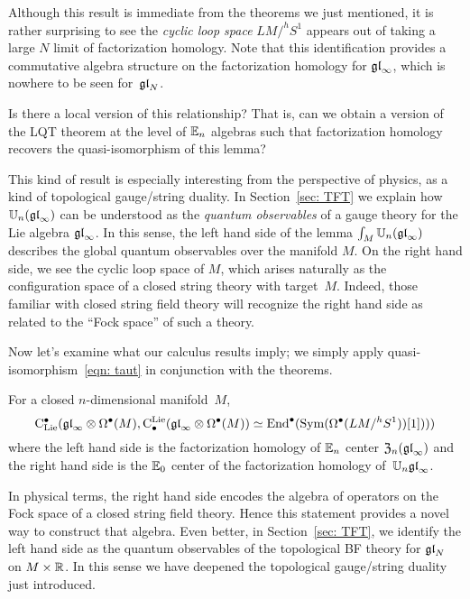 \documentclass[11pt]{amsart}
\numberwithin{equation}{section}
\begin{document}
Although this result is immediate from the theorems we just mentioned,
it is rather surprising to see the {\em cyclic loop space} $LM/^h S^1$ appears out of taking a large $N$ limit of factorization homology.
Note that this identification provides a commutative algebra structure on the factorization homology for ${\mathfrak{gl}}_\infty$, 
which is nowhere to be seen for~${\mathfrak{gl}}_N$.

\begin{qtn}
Is there a local version of this relationship? That is, can we obtain a version of the LQT theorem at the level of $\mathbb E_n$ algebras such that factorization homology recovers the quasi-isomorphism of this lemma?
\end{qtn}

This kind of result is especially interesting from the perspective of physics, 
as a kind of topological gauge/string duality.
In Section~\ref{sec: TFT} we explain how $\mathbb U_n({\mathfrak{gl}}_\infty)$ can be understood as the {\em quantum observables} of a gauge theory for the Lie algebra ${\mathfrak{gl}}_\infty$.
In this sense, the left hand side of the lemma $\int_M \mathbb U_n(\frak{gl}_\infty)$ describes the global quantum observables over the manifold $M$.
On the right hand side, we see the cyclic loop space of $M$,
which arises naturally as the configuration space of a closed string theory with target~$M$.
Indeed, those familiar with closed string field theory will recognize the right hand side as related to the ``Fock space'' of such a theory.

Now let's examine what our calculus results imply;
we simply apply quasi-isomorphism~\eqref{eqn: taut} in conjunction with the theorems.

\begin{lmm}
For a closed $n$-dimensional manifold~$M$, 
\[
{\rm C}_{\rm Lie}^\bullet({\mathfrak{gl}}_\infty \otimes \Omega^\bullet(M), {\rm C}^{\rm Lie}_\bullet({\mathfrak{gl}}_\infty \otimes \Omega^\bullet(M)) \simeq {\rm End}^\bullet({\rm Sym}(\Omega^\bullet(LM/^h S^1))[1])))
\]
where the left hand side is the factorization homology of $\mathbb E_n$ center ${\frak Z}_n({\mathfrak{gl}}_\infty)$ and the right hand side is the $\mathbb E_0$ center of the factorization homology of~$\mathbb U_n {\mathfrak{gl}}_\infty$.
\end{lmm}

In physical terms, the right hand side encodes the algebra of operators on the Fock space of a closed string field theory.
Hence this statement provides a novel way to construct that algebra.
Even better, in Section~\ref{sec: TFT}, we identify the left hand side as the quantum observables of the topological BF theory for ${\mathfrak{gl}}_N$ on $M \times \mathbb R$.
In this sense we have deepened the topological gauge/string duality just introduced.
\end{document}
